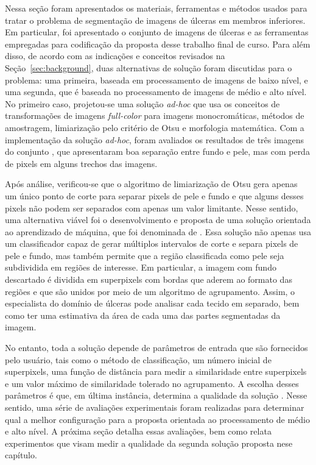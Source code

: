 Nessa seção foram apresentados os materiais, ferramentas e métodos usados para tratar o problema de segmentação de imagens de úlceras em membros inferiores.
Em particular, foi apresentado o conjunto de imagens de úlceras \dataset e as ferramentas empregadas para codificação da proposta desse trabalho final de curso.
Para além disso, de acordo com as indicações e conceitos revisados na Seção~\ref{sec:background}, duas alternativas de solução foram discutidas para o problema: uma primeira, baseada em processamento de imagens de baixo nível, e uma segunda, que é baseada no processamento de imagens de médio e alto nível.
No primeiro caso, projetou-se uma solução \textit{ad-hoc} que usa os conceitos de transformações de imagens \textit{full-color} para imagens monocromáticas, métodos de amostragem, limiarização pelo critério de Otsu e morfologia matemática.
Com a implementação da solução \textit{ad-hoc}, foram avaliados os resultados de três imagens do conjunto \dataset, que apresentaram boa separação entre fundo e pele, mas com perda de pixels em alguns trechos das imagens.

Após análise, verificou-se que o algoritmo de limiarização de Otsu gera apenas um único ponto de corte para separar pixels de pele e fundo e que alguns desses pixels não podem ser separados com apenas um valor limitante.
Nesse sentido, uma alternativa viável foi o desenvolvimento e proposta de uma solução orientada ao aprendizado de máquina, que foi denominada de \system.
Essa solução não apenas usa um classificador capaz de gerar múltiplos intervalos de corte e separa pixels de pele e fundo, mas também permite que a região classificada como pele seja subdividida em regiões de interesse.
Em particular, a imagem com fundo descartado é dividida em superpixels com bordas que aderem ao formato das regiões e que são unidos por meio de um algoritmo de agrupamento.
Assim, o especialista do domínio de úlceras pode analisar cada tecido em separado, bem como ter uma estimativa da área de cada uma das partes segmentadas da imagem.

No entanto, toda a solução \system depende de parâmetros de entrada que são fornecidos pelo usuário, tais como o método de classificação, um número inicial de superpixels, uma função de distância para medir a similaridade entre superpixels e um valor máximo de similaridade tolerado no agrupamento.
A escolha desses parâmetros é que, em última instância, determina a qualidade da solução \system.
Nesse sentido, uma série de avaliações experimentais foram realizadas para determinar qual a melhor configuração para a proposta orientada ao processamento de médio e alto nível.
A próxima seção detalha essas avaliações, bem como relata experimentos que visam medir a qualidade da segunda solução proposta nese capítulo.
\newpage
\thispagestyle{plain} %
\mbox{}


